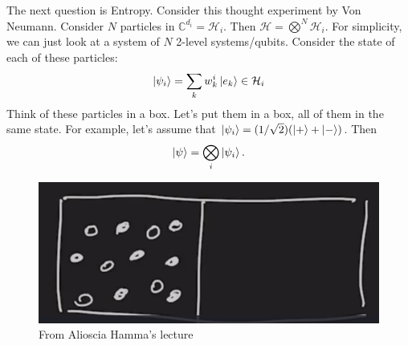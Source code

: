 \documentclass{book}
\theoremstyle{definition}
\newcommand{\had}{\mathcal{H}}
\begin{document}
The next question is Entropy. Consider this thought experiment by Von Neumann. Consider $N$ particles in $\mathbb{C}^{d_i} = \had_i$. Then $\had = \bigotimes^N \had_i$. For simplicity, we can just look at a system of $N$ 2-level systems/qubits. Consider the state of each of these particles: 
\begin{align}
\ket{\psi_i} = \sum_k w_k^i \ket{e_k} \in \had_i
\end{align}
Think of these particles in a box. Let's put them in a box, all of them in the same state. For example, let's assume that $\ket{\psi_i} = (1/\sqrt{2})(\ket{+} + \ket{-})$. Then 
\begin{align}
\ket{\psi} = \bigotimes_i \ket{\psi_i}.
\end{align}
\begin{figure}[!htb]
	\centering
	\includegraphics[scale=0.4]{entropy}
	\caption{From Alioscia Hamma's lecture}
\end{figure}
\end{document}
